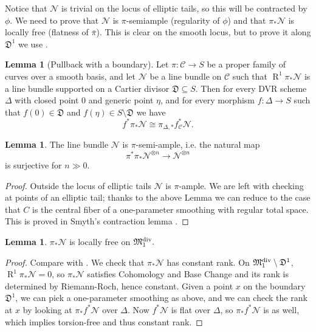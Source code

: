 \documentclass[11pt]{amsart}
\renewcommand{\to}{\rightarrow}
\newcommand{\MM}{\mathfrak M}
\newcommand{\dvr}{\Delta}
\newcommand{\cC}{\mathcal{C}}
\theoremstyle{definition}
\newtheorem{lem}[thm]{Lemma}
\theoremstyle{definition}
\begin{document}
Notice that $\mathcal N$ is trivial on the locus of elliptic tails, so this will be contracted by $\phi$. We need to prove that $\mathcal N$ is $\pi$-semiample (regularity of $\phi$) and that $\pi_*\mathcal N$ is locally free (flatness of $\bar{\pi}$). This is clear on the smooth locus, but to prove it along $\mathfrak D^1$ we use \cite[Lemmma~3.7.2.2]{RSPW}.
\begin{lem}[Pullback with a boundary]\label{DVR}
Let $\pi\colon\cC\to S$ be a proper family of curves over a smooth basis, and let $\mathcal N$ be a line bundle on $\cC$ such that $\operatorname{R}^1\pi_*\mathcal N$ is a line bundle supported on a Cartier divisor $\mathfrak D\subseteq S$. Then for every DVR scheme $\dvr$ with closed point $0$ and generic point $\eta$, and for every morphism $f\colon \dvr\to S$ such that $f(0)\in\mathfrak D$ and $f(\eta)\in S\setminus\mathfrak D$ we have
\[f^*\pi_*\mathcal N\cong \pi_{\dvr,*}f_\cC^*\mathcal N.\]
\end{lem}

\begin{lem}\label{lemma:semiample}
The line bundle $\mathcal N$ is $\pi$-semi-ample, i.e. the natural map
\[\pi^*\pi_*\mathcal N^{\otimes n}\to \mathcal N^{\otimes n}\]
is surjective for $n\gg 0$.
\end{lem}
\begin{proof}
Outside the locus of elliptic tails $\mathcal N$ is $\pi$-ample. We are left with checking at points of an elliptic tail; thanks to the above Lemma we can reduce to the case that $C$ is the central fiber of a one-parameter smoothing with regular total space. This is proved in Smyth's contraction lemma \cite[Lemma~2.12]{SMY1}.
\end{proof}

\begin{lem}
$\pi_*\mathcal N$ is locally free on $\MM_1^{\rm{div}}.$
\end{lem}
\begin{proof} Compare with \cite[Proposition~3.7.2.1]{RSPW}.
We check that $\pi_*\mathcal N$ has constant rank.
On $\MM_1^{\rm{div}}\setminus \mathfrak{D}^1$, $\operatorname{R}^1\pi_*\mathcal N=0$, so $\pi_*\mathcal N$ satisfies Cohomology and Base Change \cite[Theorem III.12.11]{HAR} and its rank is determined by Riemann-Roch, hence constant.
Given a point $x$ on the boundary $\mathfrak{D}^1$, we can pick a one-parameter smoothing as above, and we can check the rank at $x$ by looking at $\pi_*f^*\mathcal N$ over $\dvr.$ Now $f^*\mathcal N$ is flat over $\dvr$, so $\pi_*f^*\mathcal N$ is as well, which implies torsion-free and thus constant rank.
\end{proof}
\end{document}

